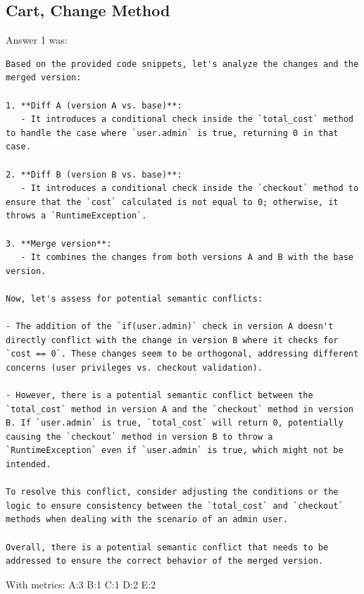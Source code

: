 \subsection{Cart, Change Method}

Answer 1 was:
\begin{lstlisting}
Based on the provided code snippets, let's analyze the changes and the merged version:

1. **Diff A (version A vs. base)**:
   - It introduces a conditional check inside the `total_cost` method to handle the case where `user.admin` is true, returning 0 in that case.

2. **Diff B (version B vs. base)**:
   - It introduces a conditional check inside the `checkout` method to ensure that the `cost` calculated is not equal to 0; otherwise, it throws a `RuntimeException`.

3. **Merge version**:
   - It combines the changes from both versions A and B with the base version.

Now, let's assess for potential semantic conflicts:

- The addition of the `if(user.admin)` check in version A doesn't directly conflict with the change in version B where it checks for `cost == 0`. These changes seem to be orthogonal, addressing different concerns (user privileges vs. checkout validation).
  
- However, there is a potential semantic conflict between the `total_cost` method in version A and the `checkout` method in version B. If `user.admin` is true, `total_cost` will return 0, potentially causing the `checkout` method in version B to throw a `RuntimeException` even if `user.admin` is true, which might not be intended.

To resolve this conflict, consider adjusting the conditions or the logic to ensure consistency between the `total_cost` and `checkout` methods when dealing with the scenario of an admin user.

Overall, there is a potential semantic conflict that needs to be addressed to ensure the correct behavior of the merged version.
\end{lstlisting}

With metrics:
A:3
B:1
C:1
D:2
E:2


